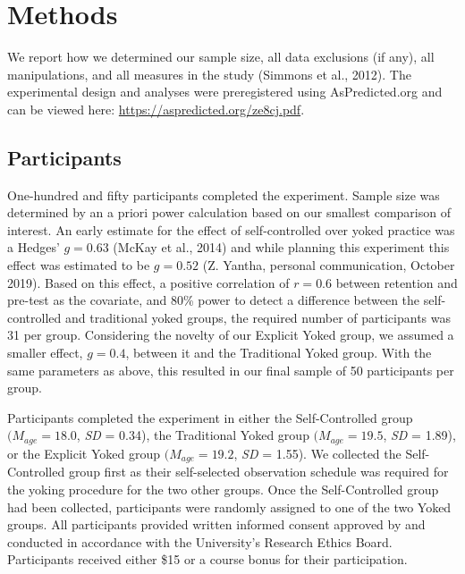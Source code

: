 \documentclass[
  english,
  man,floatsintext]{apa7}
\begin{document}
\hypertarget{methods}{%
\section{Methods}\label{methods}}

We report how we determined our sample size, all data exclusions (if any), all manipulations, and all measures in the study (Simmons et al., 2012). The experimental design and analyses were preregistered using AsPredicted.org and can be viewed here: \url{https://aspredicted.org/ze8cj.pdf}.

\hypertarget{participants}{%
\subsection{Participants}\label{participants}}

One-hundred and fifty participants completed the experiment. Sample size was determined by an a priori power calculation based on our smallest comparison of interest. An early estimate for the effect of self-controlled over yoked practice was a Hedges' \(g = 0.63\) (McKay et al., 2014) and while planning this experiment this effect was estimated to be \(g = 0.52\) (Z. Yantha, personal communication, October 2019). Based on this effect, a positive correlation of \(r = 0.6\) between retention and pre-test as the covariate, and 80\% power to detect a difference between the self-controlled and traditional yoked groups, the required number of participants was 31 per group. Considering the novelty of our Explicit Yoked group, we assumed a smaller effect, \(g = 0.4\), between it and the Traditional Yoked group. With the same parameters as above, this resulted in our final sample of 50 participants per group.

Participants completed the experiment in either the Self-Controlled group \((M_{age} = 18.0\), \emph{SD} = 0.34), the Traditional Yoked group \((M_{age} = 19.5\), \emph{SD} = 1.89), or the Explicit Yoked group \((M_{age} = 19.2\), \emph{SD} = 1.55). We collected the Self-Controlled group first as their self-selected observation schedule was required for the yoking procedure for the two other groups. Once the Self-Controlled group had been collected, participants were randomly assigned to one of the two Yoked groups. All participants provided written informed consent approved by and conducted in accordance with the University's Research Ethics Board. Participants received either \$15 or a course bonus for their participation.
\end{document}
